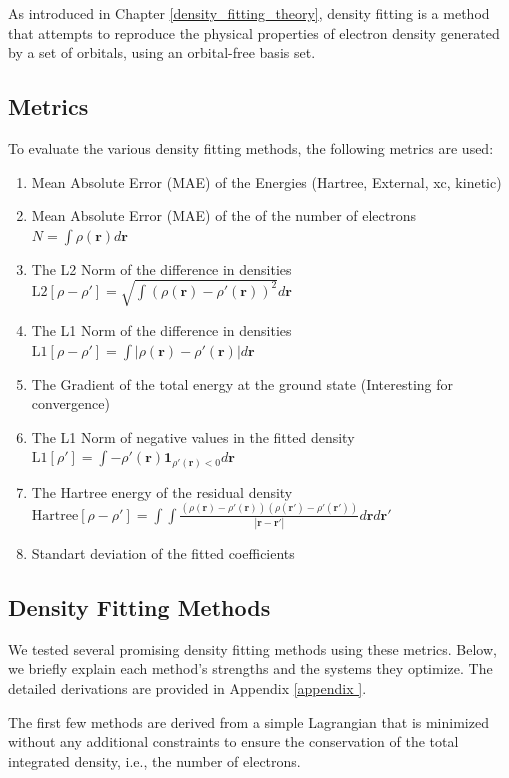 As introduced in Chapter \ref{density_fitting_theory}, density fitting is a method that attempts to reproduce the physical properties of electron density generated by a set of orbitals, using an orbital-free basis set.
\subsection{Metrics}
To evaluate the various density fitting methods, the following metrics are used:\begin{enumerate}
    \item Mean Absolute Error (MAE) of the Energies (Hartree, External, xc, kinetic)
    \item Mean Absolute Error (MAE) of the of the number of electrons $N = \int \rho(\mathbf{r}) d\mathbf{r}$
    \item The L2 Norm of the difference in densities $\text{L2}[\rho-\rho'] = \sqrt{\int (\rho(\mathbf{r})-\rho'(\mathbf{r}))^2} d\mathbf{r}$
    \item The L1 Norm of the difference in densities $\text{L1}[\rho-\rho'] = \int |\rho(\mathbf{r})-\rho'(\mathbf{r})| d\mathbf{r}$
    \item The Gradient of the total energy at the ground state (Interesting for convergence)
    \item The L1 Norm of negative values in the fitted density $\text{L1}[\rho'] = \int -\rho'(\mathbf{r})\mathbf{1}_{\rho'(\mathbf{r})<0} d\mathbf{r}$
    \item The Hartree energy of the residual density $\text{Hartree}[\rho-\rho'] = \int \int \frac{(\rho(\mathbf{r})-\rho'(\mathbf{r}))(\rho(\mathbf{r'})-\rho'(\mathbf{r'}))}{|\mathbf{r}-\mathbf{r'}|}d\mathbf{r}d\mathbf{r'}$
    \item Standart deviation of the fitted coefficients
\end{enumerate}
\subsection{Density Fitting Methods}

We tested several promising density fitting methods using these metrics. Below, we briefly explain each method’s strengths and the systems they optimize. The detailed derivations are provided in Appendix \ref{appendix
}.

The first few methods are derived from a simple Lagrangian that is minimized without any additional constraints to ensure the conservation of the total integrated density, i.e., the number of electrons.
